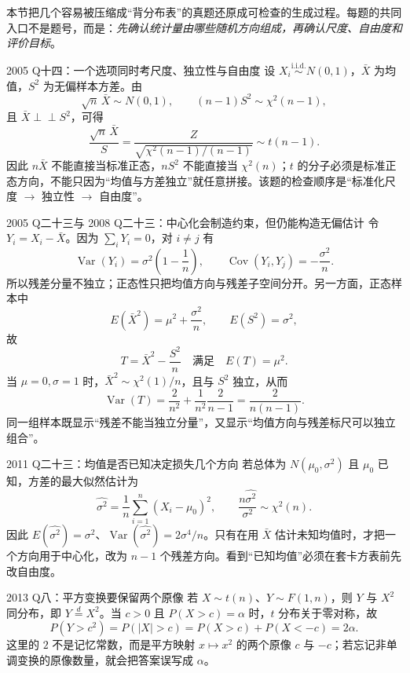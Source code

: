 \documentclass[11pt,a4paper]{ctexart}
\newcommand{\indep}{\mathrel{\perp\!\!\!\perp}}
\begin{document}
本节把几个容易被压缩成“背分布表”的真题还原成可检查的生成过程。每题的共同入口不是题号，而是：\emph{先确认统计量由哪些随机方向组成，再确认尺度、自由度和评价目标}。

\begin{examplebox}{2005 Q十四：一个选项同时考尺度、独立性与自由度}
设 $X_i\overset{\mathrm{i.i.d.}}\sim N(0,1)$，$\bar X$ 为均值，$S^2$ 为无偏样本方差。由
\[
\sqrt n\,\bar X\sim N(0,1),\qquad (n-1)S^2\sim\chi^2(n-1),
\]
且 $\bar X\indep S^2$，可得
\[
\frac{\sqrt n\,\bar X}{S}
 =\frac{Z}{\sqrt{\chi^2(n-1)/(n-1)}}\sim t(n-1).
\]
因此 $n\bar X$ 不能直接当标准正态，$nS^2$ 不能直接当 $\chi^2(n)$；$t$ 的分子必须是标准正态方向，不能只因为“均值与方差独立”就任意拼接。该题的检查顺序是“标准化尺度 $\to$ 独立性 $\to$ 自由度”。
\end{examplebox}

\begin{examplebox}{2005 Q二十三与 2008 Q二十三：中心化会制造约束，但仍能构造无偏估计}
令 $Y_i=X_i-\bar X$。因为 $\sum_iY_i=0$，对 $i\ne j$ 有
\[
\operatorname{Var}(Y_i)=\sigma^2\left(1-\frac1n\right),\qquad
\operatorname{Cov}(Y_i,Y_j)=-\frac{\sigma^2}{n}.
\]
所以残差分量不独立；正态性只把均值方向与残差子空间分开。另一方面，正态样本中
\[
E(\bar X^2)=\mu^2+\frac{\sigma^2}{n},\qquad E(S^2)=\sigma^2,
\]
故
\[
T=\bar X^2-\frac{S^2}{n}
\quad\text{满足}\quad E(T)=\mu^2.
\]
当 $\mu=0,\sigma=1$ 时，$\bar X^2\sim\chi^2(1)/n$，且与 $S^2$ 独立，从而
\[
\operatorname{Var}(T)=\frac{2}{n^2}+\frac1{n^2}\frac{2}{n-1}
 =\frac{2}{n(n-1)}.
\]
同一组样本既显示“残差不能当独立分量”，又显示“均值方向与残差标尺可以独立组合”。
\end{examplebox}

\begin{examplebox}{2011 Q二十三：均值是否已知决定损失几个方向}
若总体为 $N(\mu_0,\sigma^2)$ 且 $\mu_0$ 已知，方差的最大似然估计为
\[
\widehat{\sigma^2}=\frac1n\sum_{i=1}^n(X_i-\mu_0)^2,
\qquad \frac{n\widehat{\sigma^2}}{\sigma^2}\sim\chi^2(n).
\]
因此 $E(\widehat{\sigma^2})=\sigma^2$、$\operatorname{Var}(\widehat{\sigma^2})=2\sigma^4/n$。只有在用 $\bar X$ 估计未知均值时，才把一个方向用于中心化，改为 $n-1$ 个残差方向。看到“已知均值”必须在套卡方表前先改自由度。
\end{examplebox}

\begin{examplebox}{2013 Q八：平方变换要保留两个原像}
若 $X\sim t(n)$、$Y\sim F(1,n)$，则 $Y$ 与 $X^2$ 同分布，即 $Y\overset{d}{=}X^2$。当 $c>0$ 且 $P(X>c)=\alpha$ 时，$t$ 分布关于零对称，故
\[
P(Y>c^2)=P(\lvert X\rvert>c)=P(X>c)+P(X<-c)=2\alpha.
\]
这里的 $2$ 不是记忆常数，而是平方映射 $x\mapsto x^2$ 的两个原像 $c$ 与 $-c$；若忘记非单调变换的原像数量，就会把答案误写成 $\alpha$。
\end{examplebox}
\end{document}
